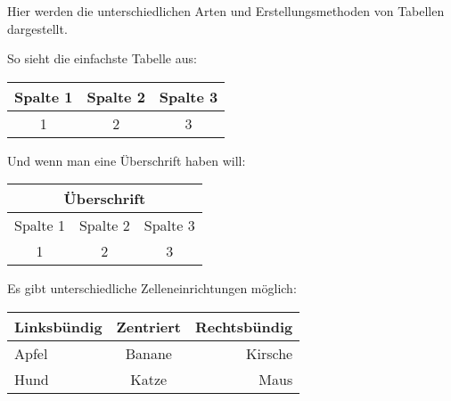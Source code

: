 \documentclass[a4paper, 12pt]{article}
\begin{document}
Hier werden die unterschiedlichen Arten und Erstellungsmethoden von Tabellen dargestellt.

So sieht die einfachste Tabelle aus:

\begin{tabular}{|c|c|c|}
\hline
Spalte 1 & Spalte 2 & Spalte 3 \\
\hline
1 & 2 & 3 \\
\hline
\end{tabular}

Und wenn man eine Überschrift haben will:

\begin{tabular}{|c|c|c|}
\hline
\multicolumn{3}{|c|}{Überschrift}\\
\hline
Spalte 1 & Spalte 2 & Spalte 3 \\
\hline
1 & 2 & 3 \\
\hline
\end{tabular}

Es gibt unterschiedliche Zelleneinrichtungen möglich:

\begin{tabular}{|l|c|r|}
    \hline
    Linksbündig & Zentriert & Rechtsbündig \\
    \hline
    Apfel & Banane & Kirsche \\
    \hline
    Hund & Katze & Maus \\
    \hline
\end{tabular}
\end{document}
